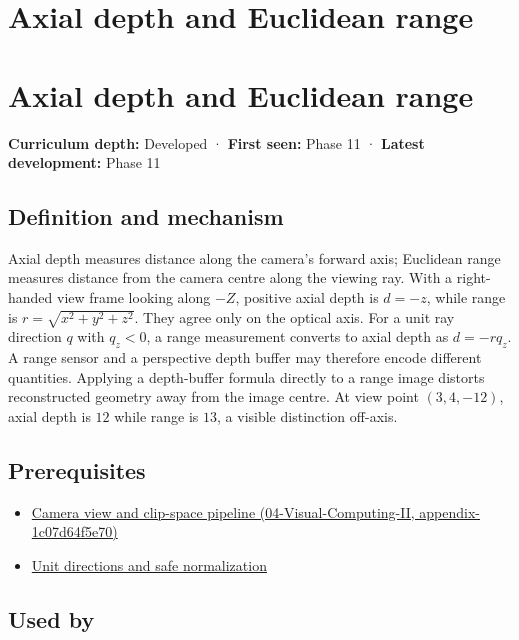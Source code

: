 \hypertarget{appendix-cac01ebeeb11}{}
\section*{Axial depth and Euclidean range}
\section{Axial depth and Euclidean range}\label{appendix-cac01ebeeb11-axial-depth-and-euclidean-range}

\textbf{Curriculum depth:} Developed · \textbf{First seen:} Phase 11 · \textbf{Latest development:} Phase 11

\subsection{Definition and mechanism}\label{appendix-cac01ebeeb11-definition-and-mechanism}

Axial depth measures distance along the camera's forward axis; Euclidean range measures distance from the camera centre along the viewing ray. With a right-handed view frame looking along \(-Z\), positive axial depth is \(d=-z\), while range is \(r=\sqrt{x^2+y^2+z^2}\). They agree only on the optical axis. For a unit ray direction \(q\) with \(q_z<0\), a range measurement converts to axial depth as \(d=-rq_z\). A range sensor and a perspective depth buffer may therefore encode different quantities. Applying a depth-buffer formula directly to a range image distorts reconstructed geometry away from the image centre. At view point \((3,4,-12)\), axial depth is \(12\) while range is \(13\), a visible distinction off-axis.

\subsection{Prerequisites}\label{appendix-cac01ebeeb11-prerequisites}

\begin{itemize}
\tightlist
\item
  \href{../04-Visual-Computing-II/main.pdf\#nameddest=appendix-1c07d64f5e70}{Camera view and clip-space pipeline (04-Visual-Computing-II, appendix-1c07d64f5e70)}
\item
  \hyperref[appendix-f744e41b95b4]{Unit directions and safe normalization}
\end{itemize}

\subsection{Used by}\label{appendix-cac01ebeeb11-used-by}

